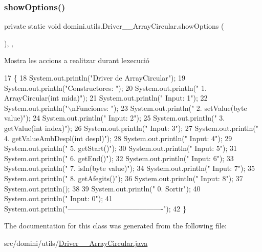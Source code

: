 \subsubsection{\texorpdfstring{show\+Options()}{showOptions()}}
{\footnotesize\ttfamily private static void domini.\+utils.\+Driver\+\_\+\+\_\+\+Array\+Circular.\+show\+Options (\begin{DoxyParamCaption}{ }\end{DoxyParamCaption})\hspace{0.3cm}{\ttfamily [inline]}, {\ttfamily [static]}, {\ttfamily [private]}}



Mostra les accions a realitzar durant l\textquotesingle{}execució 


\begin{DoxyCode}
17                                      \{
18         System.out.println(\textcolor{stringliteral}{"Driver de ArrayCircular"});
19         System.out.println(\textcolor{stringliteral}{"Constructores: "});
20         System.out.println(\textcolor{stringliteral}{"     1. ArrayCircular(int mida)"});
21         System.out.println(\textcolor{stringliteral}{"     Input: 1"});
22         System.out.println(\textcolor{stringliteral}{"\(\backslash\)nFunciones: "});
23         System.out.println(\textcolor{stringliteral}{"     2. setValue(byte value)"});
24         System.out.println(\textcolor{stringliteral}{"     Input: 2"});
25         System.out.println(\textcolor{stringliteral}{"     3. getValue(int index)"});
26         System.out.println(\textcolor{stringliteral}{"     Input: 3"});
27         System.out.println(\textcolor{stringliteral}{"     4. getValueAmbDespl(int despl)"});
28         System.out.println(\textcolor{stringliteral}{"     Input: 4"});
29         System.out.println(\textcolor{stringliteral}{"     5. getStart()"});
30         System.out.println(\textcolor{stringliteral}{"     Input: 5"});
31         System.out.println(\textcolor{stringliteral}{"     6. getEnd()"});
32         System.out.println(\textcolor{stringliteral}{"     Input: 6"});
33         System.out.println(\textcolor{stringliteral}{"     7. isIn(byte value)"});
34         System.out.println(\textcolor{stringliteral}{"     Input: 7"});
35         System.out.println(\textcolor{stringliteral}{"     8. getAfegits()"});
36         System.out.println(\textcolor{stringliteral}{"     Input: 8"});
37         System.out.println();
38 
39         System.out.println(\textcolor{stringliteral}{"     0. Sortir"});
40         System.out.println(\textcolor{stringliteral}{"     Input: 0"});
41         System.out.println(\textcolor{stringliteral}{"----------------------------------------"});
42     \}
\end{DoxyCode}


The documentation for this class was generated from the following file\+:\begin{DoxyCompactItemize}
\item 
src/domini/utils/\hyperlink{Driver____ArrayCircular_8java}{Driver\+\_\+\+\_\+\+Array\+Circular.\+java}\end{DoxyCompactItemize}
